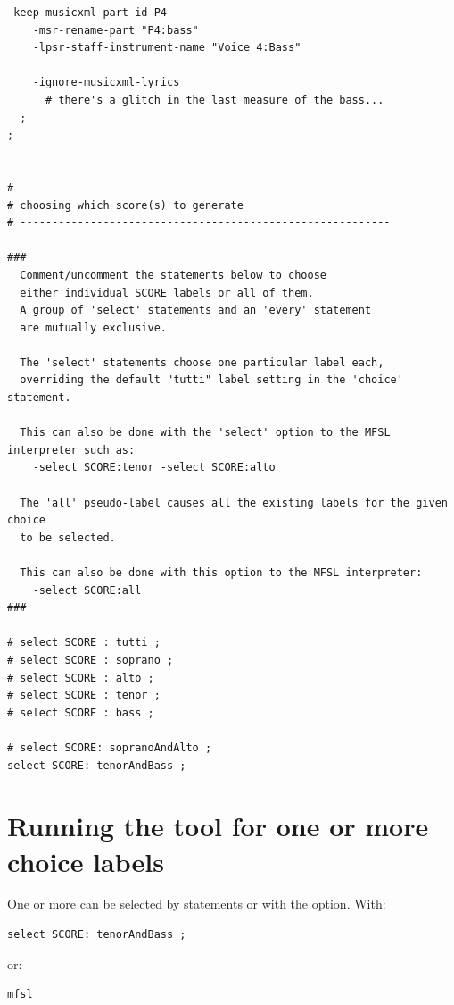 \begin{lstlisting}[language=MFSL]
    -keep-musicxml-part-id P4
    -msr-rename-part "P4:bass"
    -lpsr-staff-instrument-name "Voice 4:Bass"

    -ignore-musicxml-lyrics
      # there's a glitch in the last measure of the bass...
  ;
;


# ----------------------------------------------------------
# choosing which score(s) to generate
# ----------------------------------------------------------

###
  Comment/uncomment the statements below to choose
  either individual SCORE labels or all of them.
  A group of 'select' statements and an 'every' statement
  are mutually exclusive.

  The 'select' statements choose one particular label each,
  overriding the default "tutti" label setting in the 'choice' statement.

  This can also be done with the 'select' option to the MFSL interpreter such as:
    -select SCORE:tenor -select SCORE:alto

  The 'all' pseudo-label causes all the existing labels for the given choice
  to be selected.

  This can also be done with this option to the MFSL interpreter:
    -select SCORE:all
###

# select SCORE : tutti ;
# select SCORE : soprano ;
# select SCORE : alto ;
# select SCORE : tenor ;
# select SCORE : bass ;

# select SCORE: sopranoAndAlto ;
select SCORE: tenorAndBass ;
\end{lstlisting}


\section{Running the tool for one or more choice labels}

One or more can be selected by \code{select]} statements or with the  option.
With:
\begin{lstlisting}[language=MFSL]
select SCORE: tenorAndBass ;
\end{lstlisting}

 or:  %
\begin{lstlisting}[language=Terminal]
mfsl
\end{lstlisting}

